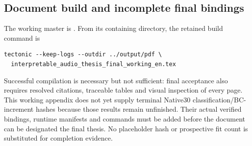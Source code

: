 \subsection{Document build and incomplete final bindings}
The working master is
.
From its containing directory, the retained build command is
\begin{verbatim}
tectonic --keep-logs --outdir ../output/pdf \
  interpretable_audio_thesis_final_working_en.tex
\end{verbatim}
Successful compilation is necessary but not sufficient: final acceptance
also requires resolved citations, traceable tables and visual inspection of
every page. This working appendix does not yet supply terminal Native30
classification/BC-increment hashes because those results remain unfinished.
Their actual verified bindings, runtime manifests and commands must be added
before the document can be designated the final thesis. No placeholder hash
or prospective fit count is substituted for completion evidence.\par
\endgroup
